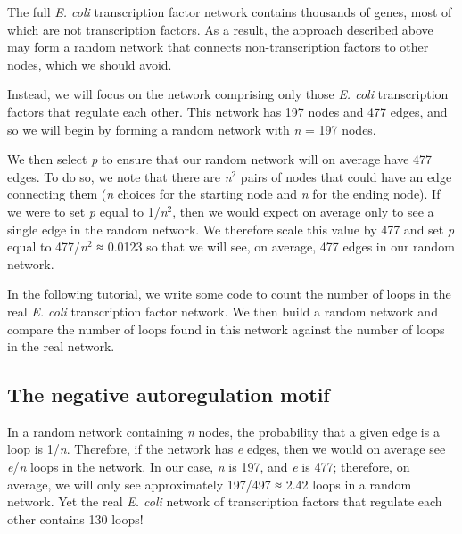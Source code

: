 \begin{note}\end{note}

\begin{qbox}\end{qbox} 

The full \textit{E. coli} transcription factor network contains thousands of genes, most of which are not transcription factors. As a result, the approach described above may form a random network that connects non-transcription factors to other nodes, which we should avoid.

Instead, we will focus on the network comprising only those \textit{E. coli} transcription factors that regulate each other. This network has 197 nodes and 477 edges, and so we will begin by forming a random network with \textit{n} = 197 nodes.

We then select \textit{p} to ensure that our random network will on average have 477 edges. To do so, we note that there are \textit{n}$^2$ pairs of nodes that could have an edge connecting them (\textit{n} choices for the starting node and \textit{n} for the ending node). If we were to set \textit{p} equal to 1/\textit{n}$^2$, then we would expect on average only to see a single edge in the random network. We therefore scale this value by 477 and set \textit{p} equal to 477/\textit{n}$^2$ ≈ 0.0123 so that we will see, on average, 477 edges in our random network.

In the following tutorial, we write some code to count the number of loops in the real \textit{E. coli} transcription factor network. We then build a random network and compare the number of loops found in this network against the number of loops in the real network.

\FloatBarrier
{}
\subsection{The negative autoregulation motif}

In a random network containing \textit{n} nodes, the probability that a given edge is a loop is 1/\textit{n}. Therefore, if the network has \textit{e} edges, then we would on average see \textit{e}/\textit{n} loops in the network. In our case, \textit{n} is 197, and \textit{e} is 477; therefore, on average, we will only see approximately 197/497 ≈ 2.42 loops in a random network. Yet the real \textit{E. coli} network of transcription factors that regulate each other contains 130 loops!


